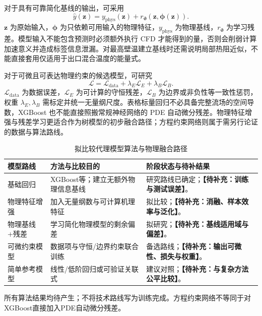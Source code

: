 \documentclass[stage2,UTF8,fontset=fandol]{ydzjreport}
\DeclareRobustCommand{\TBD}[1]{{\color{ydzjgrey}\textbf{【待补充：#1】}}}
\begin{document}
对于具有可靠简化基线的输出，可采用
\begin{equation}
\widehat y(\bm z)=y_{\mathrm{phys}}(\bm z)+r_{\boldsymbol\vartheta}(\bm z,\bm\phi(\bm z)).\label{eq:residualmodel}
\end{equation}
$\bm z$ 为原始输入，$\bm\phi$ 为只依赖可用输入的物理特征，$y_{\mathrm{phys}}$ 为物理基线，$r_{\boldsymbol\vartheta}$ 为学习残差。模型输入不能包含预测时必须额外执行 CFD 才能得到的量，否则会削弱计算加速意义并造成标签信息泄漏。对最高壁温建立基线时还需说明局部热阻近似，不能直接套用仅适用于出口混合温度的能量式。

对于可微且可表达物理约束的候选模型，可研究
\begin{equation}
\mathcal L=\mathcal L_{\mathrm{data}}+\lambda_E\mathcal L_E+\lambda_B\mathcal L_B.\label{eq:loss}
\end{equation}
$\mathcal L_{\mathrm{data}}$ 为数据误差，$\mathcal L_E$ 为可计算的守恒残差，$\mathcal L_B$ 为边界或非负性等一致性惩罚，权重 $\lambda_E,\lambda_B$ 需标定并统一无量纲尺度。表格标量回归不必具备完整流场的空间导数，XGBoost 也不能直接照搬常规神经网络的 PDE 自动微分残差。物理特征增强与残差学习更适合作为树模型的初步融合路径；方程约束网络则属于需另行论证的数据与算法路线。
\begin{table}[htbp]
\centering\small
\caption{拟比较代理模型算法与物理融合路径}\label{tab:13}
\begin{tabularx}{\linewidth}{lYY}
\toprule
{} 模型路线 & 方法与比较目的 & 阶段状态与待补结果 \\
\midrule
基础回归 & XGBoost等；建立无额外物理信息基线 & 研究路线已确定；\TBD{训练与测试误差}。 \\
物理特征增强 & 加入无量纲数与可计算机理特征 & 拟比较；\TBD{消融、样本效率与泛化}。 \\
物理基线+残差 & 学习简化物理模型的剩余偏差 & 拟研究；\TBD{基线适用域与偏差}。 \\
可微约束模型 & 数据项与守恒/边界约束联合训练 & 备选路线；\TBD{输出可微性、损失与权重}。 \\
简单参考模型 & 线性/低阶回归或可验证关联式 & 建议对照；\TBD{与复杂方法公平比较}。 \\
\bottomrule
\end{tabularx}
\par\smallskip\begin{minipage}{\linewidth}\footnotesize 所有算法结果均待产生；不将技术路线写为训练完成。方程约束网络不等同于对XGBoost直接加入PDE自动微分残差。\end{minipage}
\end{table}
\end{document}
